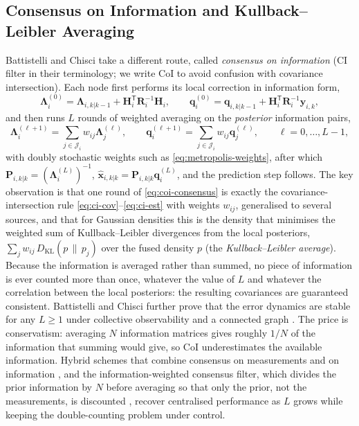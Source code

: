 \documentclass[graybox,envcountchap]{style/SNmono}
\begin{document}
\subsection{Consensus on Information and Kullback--Leibler Averaging}
\label{subsec:mas-coi}

Battistelli and Chisci \cite{battistelli2014_kl_consensus} take a different route, called \emph{consensus on information} (CI filter in their terminology; we write CoI to avoid confusion with covariance intersection). Each node first performs its local correction in information form,
\begin{equation}
\mathbf{\Lambda}_i^{(0)}=\mathbf{\Lambda}_{i,k|k-1}+\mathbf{H}_i^{\mathsf T}\mathbf{R}_i^{-1}\mathbf{H}_i,\qquad
\mathbf{q}_i^{(0)}=\mathbf{q}_{i,k|k-1}+\mathbf{H}_i^{\mathsf T}\mathbf{R}_i^{-1}\mathbf{y}_{i,k},
\label{eq:coi-local}
\end{equation}
and then runs $L$ rounds of weighted averaging on the \emph{posterior} information pairs,
\begin{equation}
\mathbf{\Lambda}_i^{(\ell+1)}=\sum_{j\in\mathcal{J}_i}w_{ij}\mathbf{\Lambda}_j^{(\ell)},\qquad
\mathbf{q}_i^{(\ell+1)}=\sum_{j\in\mathcal{J}_i}w_{ij}\mathbf{q}_j^{(\ell)},\qquad \ell=0,\dots,L-1,
\label{eq:coi-consensus}
\end{equation}
with doubly stochastic weights such as \eqref{eq:metropolis-weights}, after which $\mathbf{P}_{i,k|k}=(\mathbf{\Lambda}_i^{(L)})^{-1}$, $\widehat{\mathbf{x}}_{i,k|k}=\mathbf{P}_{i,k|k}\mathbf{q}_i^{(L)}$, and the prediction step follows. The key observation is that one round of \eqref{eq:coi-consensus} is exactly the covariance-intersection rule \eqref{eq:ci-cov}--\eqref{eq:ci-est} with weights $w_{ij}$, generalised to several sources, and that for Gaussian densities this is the density that minimises the weighted sum of Kullback--Leibler divergences from the local posteriors, $\sum_{j}w_{ij}\,D_{\mathrm{KL}}(p\,\|\,p_j)$ over the fused density $p$ (the \emph{Kullback--Leibler average}). Because the information is averaged rather than summed, no piece of information is ever counted more than once, whatever the value of $L$ and whatever the correlation between the local posteriors: the resulting covariances are guaranteed consistent. Battistelli and Chisci further prove that the error dynamics are stable for any $L\ge1$ under collective observability and a connected graph \cite{battistelli2014_kl_consensus}. The price is conservatism: averaging $N$ information matrices gives roughly $1/N$ of the information that summing would give, so CoI underestimates the available information. Hybrid schemes that combine consensus on measurements and on information \cite{battistelli2015_cmci}, and the information-weighted consensus filter, which divides the prior information by $N$ before averaging so that only the prior, not the measurements, is discounted \cite{kamal2013_icf}, recover centralised performance as $L$ grows while keeping the double-counting problem under control.
\end{document}
